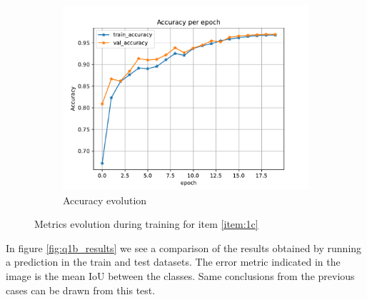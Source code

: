 \documentclass[10pt, a4paper]{article}
\begin{document}
\begin{figure}[htpb]
\begin{subfigure}[b]{0.32\textwidth}
      \centering
      \includegraphics[width=\textwidth]{images/Patch128_imagenet_acc.pdf}
      \caption{Accuracy evolution}
      \label{fig:q1c_acc}
  \end{subfigure}
  \caption{Metrics evolution during training for item \ref{item:1c}}
  \label{fig:q1c_metrics}
\end{figure}

In figure \ref{fig:q1b_results} we see a comparison of the results obtained by running a prediction in the train and test datasets. The error metric indicated
in the image is the mean IoU between the classes. Same conclusions from the previous cases can be drawn from this test.
\end{document}
